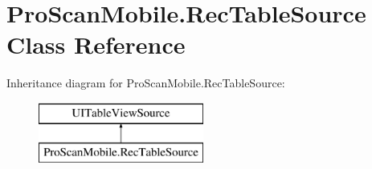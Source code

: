 \hypertarget{class_pro_scan_mobile_1_1_rec_table_source}{\section{Pro\-Scan\-Mobile.\-Rec\-Table\-Source Class Reference}
\label{class_pro_scan_mobile_1_1_rec_table_source}
}
Inheritance diagram for Pro\-Scan\-Mobile.\-Rec\-Table\-Source\-:\begin{figure}[H]
\begin{center}
\leavevmode
\includegraphics[height=2.000000cm]{class_pro_scan_mobile_1_1_rec_table_source}
\end{center}
\end{figure}

